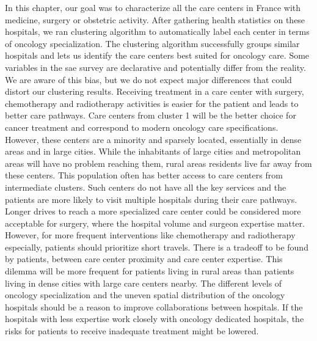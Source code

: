 In this chapter, our goal was to characterize all the care centers in France
with medicine, surgery or obstetric activity. After gathering health statistics
on these hospitals, we ran clustering algorithm to automatically label each
center in terms of oncology specialization. The clustering algorithm
successfully groups similar hospitals and lets us identify the care centers best
suited for oncology care. Some variables in the \ac{sae} survey are declarative
and potentially differ from the reality. We are aware of this bias, but we do
not expect major differences that could distort our clustering results.
Receiving treatment in a care center with surgery, chemotherapy and radiotherapy
activities is easier for the patient and leads to better care pathways. Care
centers from cluster 1 will be the better choice for cancer treatment and
correspond to modern oncology care specifications. However, these centers are a
minority and sparsely located, essentially in dense areas and in large cities.
While the inhabitants of large cities and metropolitan areas will have no
problem reaching them, rural areas residents live far away from these centers.
This population often has better access to care centers from intermediate
clusters. Such centers do not have all the key services and the patients are
more likely to visit multiple hospitals during their care pathways. Longer
drives to reach a more specialized care center could be considered more
acceptable for surgery, where the hospital volume and surgeon expertise matter.
However, for more frequent interventions like chemotherapy and radiotherapy
especially, patients should prioritize short travels. There is a tradeoff to be
found by patients, between care center proximity and care center expertise. This
dilemma will be more frequent for patients living in rural areas than patients
living in dense cities with large care centers nearby. The different levels of
oncology specialization and the uneven spatial distribution of the oncology
hospitals should be a reason to improve collaborations between hospitals.
If the hospitals with less expertise work closely with oncology dedicated
hospitals, the risks for patients to receive inadequate treatment might be
lowered.
